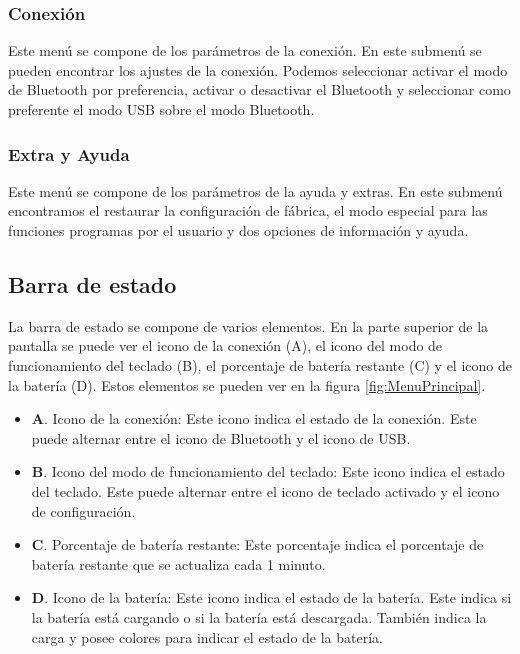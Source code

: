 \subsubsection{Conexión}
Este menú se compone de los parámetros de la conexión. En este submenú se pueden encontrar los ajustes de la conexión. Podemos seleccionar activar el modo de \gls{Bluetooth} por preferencia, activar o desactivar el \gls{Bluetooth} y seleccionar como preferente el modo \gls{USB} sobre el modo \gls{Bluetooth}.

\subsubsection{Extra y Ayuda}
Este menú se compone de los parámetros de la ayuda y extras. En este submenú encontramos el restaurar la configuración de fábrica, el modo especial para las funciones programas por el usuario y dos opciones de información y ayuda.

\subsection{Barra de estado}

La barra de estado se compone de varios elementos. En la parte superior de la pantalla se puede ver el icono de la conexión (A), el icono del modo de funcionamiento del teclado (B), el porcentaje de batería restante (C) y el icono de la batería (D). Estos elementos se pueden ver en la figura \ref{fig:MenuPrincipal}.

\begin{itemize}
    \item \textbf{A}. Icono de la conexión: Este icono indica el estado de la conexión. Este puede alternar entre el icono de \gls{Bluetooth} y el icono de \gls{USB}.
    \item \textbf{B}. Icono del modo de funcionamiento del teclado: Este icono indica el estado del teclado. Este puede alternar entre el icono de teclado activado y el icono de configuración.
    \item \textbf{C}. Porcentaje de batería restante: Este porcentaje indica el porcentaje de batería restante que se actualiza cada 1 minuto.
    \item \textbf{D}. Icono de la batería: Este icono indica el estado de la batería. Este indica si la batería está cargando o si la batería está descargada. También indica la carga y posee colores para indicar el estado de la batería.
\end{itemize}

